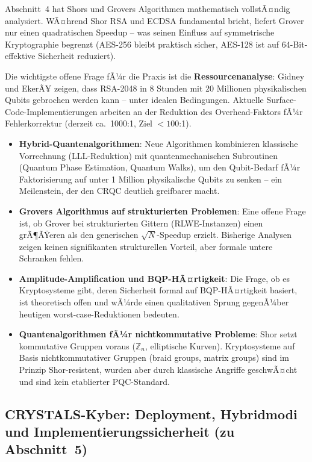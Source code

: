 ﻿\documentclass[a4paper,12pt]{article}
\theoremstyle{definition}
\begin{document}
Abschnitt~4 hat Shors und Grovers Algorithmen mathematisch vollstÃ¤ndig
analysiert. WÃ¤hrend Shor RSA und ECDSA fundamental bricht, liefert
Grover nur einen quadratischen Speedup -- was seinen Einfluss auf
symmetrische Kryptographie begrenzt (AES-256 bleibt praktisch sicher,
AES-128 ist auf 64-Bit-effektive Sicherheit reduziert).

Die wichtigste offene Frage fÃ¼r die Praxis ist die
\textbf{Ressourcenanalyse}: Gidney und EkerÃ¥ \cite{GE21} zeigen, dass
RSA-2048 in 8 Stunden mit 20 Millionen physikalischen Qubits gebrochen
werden kann -- unter idealen Bedingungen. Aktuelle
Surface-Code-Implementierungen \cite{FC09} arbeiten an der Reduktion
des Overhead-Faktors fÃ¼r Fehlerkorrektur (derzeit ca.\ 1000:1, Ziel
$<100$:1).

\begin{itemize}
  \item \textbf{Hybrid-Quantenalgorithmen}: Neue Algorithmen kombinieren
    klassische Vorrechnung (LLL-Reduktion) mit quantenmechanischen
    Subroutinen (Quantum Phase Estimation, Quantum Walks), um den
    Qubit-Bedarf fÃ¼r Faktorisierung auf unter 1 Million physikalische
    Qubits zu senken -- ein Meilenstein, der den CRQC deutlich
    greifbarer macht.
  \item \textbf{Grovers Algorithmus auf strukturierten Problemen}:
    Eine offene Frage ist, ob Grover bei strukturierten Gittern
    (RLWE-Instanzen) einen grÃ¶ÃŸeren als den generischen $\sqrt{N}$-Speedup
    erzielt. Bisherige Analysen zeigen keinen signifikanten
    strukturellen Vorteil, aber formale untere Schranken fehlen.
  \item \textbf{Amplitude-Amplification und BQP-HÃ¤rtigkeit}:
    Die Frage, ob es Kryptosysteme gibt, deren Sicherheit formal
    auf BQP-HÃ¤rtigkeit basiert, ist theoretisch offen und wÃ¼rde
    einen qualitativen Sprung gegenÃ¼ber heutigen worst-case-Reduktionen
    bedeuten.
  \item \textbf{Quantenalgorithmen fÃ¼r nichtkommutative Probleme}:
    Shor setzt kommutative Gruppen voraus ($\mathbb{Z}_n$, elliptische
    Kurven). Kryptosysteme auf Basis nichtkommutativer Gruppen
    (braid groups, matrix groups) sind im Prinzip Shor-resistent,
    wurden aber durch klassische Angriffe geschwÃ¤cht und sind kein
    etablierter PQC-Standard.
\end{itemize}

\subsection{CRYSTALS-Kyber: Deployment, Hybridmodi und Implementierungssicherheit (zu Abschnitt~5)}
\end{document}

